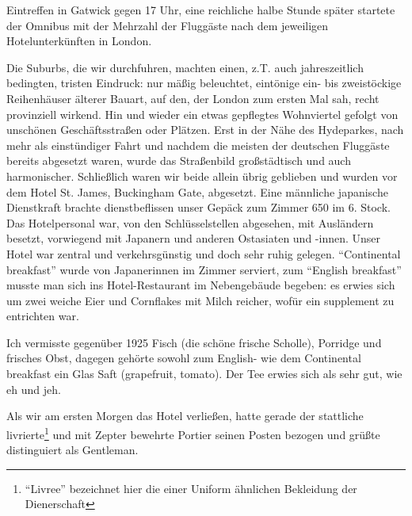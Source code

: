 Eintreffen in Gatwick gegen 17 Uhr, eine reichliche halbe Stunde später startete der Omnibus mit der Mehrzahl der Fluggäste nach dem jeweiligen Hotelunterkünften in London.

Die Suburbs, die wir durchfuhren, machten einen, z.T. auch jahreszeitlich bedingten, tristen Eindruck: nur mäßig beleuchtet, eintönige ein- bis zweistöckige Reihenhäuser älterer Bauart, auf den, der London zum ersten Mal sah, recht provinziell wirkend. Hin und wieder ein etwas gepflegtes Wohnviertel gefolgt von unschönen Geschäftsstraßen oder Plätzen. Erst in der Nähe des Hydeparkes, nach mehr als einstündiger Fahrt und nachdem die meisten der deutschen Fluggäste bereits abgesetzt waren, wurde das Straßenbild großstädtisch und auch harmonischer. Schließlich waren wir beide allein übrig geblieben und wurden vor dem Hotel St. James, Buckingham Gate, abgesetzt. Eine männliche japanische Dienstkraft brachte dienstbeflissen unser Gepäck zum Zimmer 650 im 6. Stock. Das Hotelpersonal war, von den Schlüsselstellen abgesehen, mit Ausländern besetzt, vorwiegend mit Japanern und anderen Ostasiaten und -innen. Unser Hotel war zentral und verkehrsgünstig und doch sehr ruhig gelegen. \enquote{Continental breakfast} wurde von Japanerinnen im Zimmer serviert, zum \enquote{English breakfast} musste man sich ins Hotel-Restaurant im Nebengebäude begeben: es erwies sich um zwei weiche Eier und Cornflakes mit Milch reicher, wofür ein supplement zu entrichten war.

Ich vermisste gegenüber 1925 Fisch (die schöne frische Scholle), Porridge und frisches Obst, dagegen gehörte sowohl zum English- wie dem Continental breakfast ein Glas Saft (grapefruit, tomato). Der Tee erwies sich als sehr gut, wie eh und jeh.

Als wir am ersten Morgen das Hotel verließen, hatte gerade der stattliche livrierte\footnote{\enquote{Livree} bezeichnet hier die einer Uniform ähnlichen Bekleidung der Dienerschaft} und mit Zepter bewehrte Portier seinen Posten bezogen und grüßte distinguiert als Gentleman.

